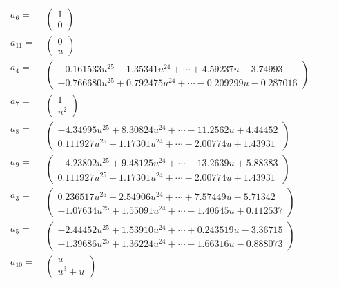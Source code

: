 \documentclass[1p]{elsarticle_modified}
\theoremstyle{definition}
\begin{document}
\begin{tabular}{m{7pt} m{180pt} m{7pt} m{180pt} }
\flushright $a_{6}=$&$\begin{pmatrix}1\\0\end{pmatrix}$ \\
\flushright $a_{11}=$&$\begin{pmatrix}0\\u\end{pmatrix}$ \\
\flushright $a_{4}=$&$\begin{pmatrix}-0.161533 u^{25}-1.35341 u^{24}+\cdots+4.59237 u-3.74993\\-0.766680 u^{25}+0.792475 u^{24}+\cdots-0.209299 u-0.287016\end{pmatrix}$ \\
\flushright $a_{7}=$&$\begin{pmatrix}1\\u^2\end{pmatrix}$ \\
\flushright $a_{8}=$&$\begin{pmatrix}-4.34995 u^{25}+8.30824 u^{24}+\cdots-11.2562 u+4.44452\\0.111927 u^{25}+1.17301 u^{24}+\cdots-2.00774 u+1.43931\end{pmatrix}$ \\
\flushright $a_{9}=$&$\begin{pmatrix}-4.23802 u^{25}+9.48125 u^{24}+\cdots-13.2639 u+5.88383\\0.111927 u^{25}+1.17301 u^{24}+\cdots-2.00774 u+1.43931\end{pmatrix}$ \\
\flushright $a_{3}=$&$\begin{pmatrix}0.236517 u^{25}-2.54906 u^{24}+\cdots+7.57449 u-5.71342\\-1.07634 u^{25}+1.55091 u^{24}+\cdots-1.40645 u+0.112537\end{pmatrix}$ \\
\flushright $a_{5}=$&$\begin{pmatrix}-2.44452 u^{25}+1.53910 u^{24}+\cdots+0.243519 u-3.36715\\-1.39686 u^{25}+1.36224 u^{24}+\cdots-1.66316 u-0.888073\end{pmatrix}$ \\
\flushright $a_{10}=$&$\begin{pmatrix}u\\u^3+u\end{pmatrix}$ \\

\end{tabular}
\end{document}
